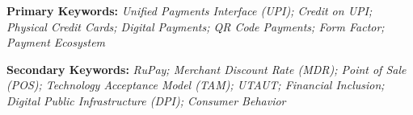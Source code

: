 \textbf{}

\textbf{Primary Keywords:}
\textit{Unified Payments Interface (UPI); Credit on UPI; Physical Credit Cards; Digital Payments; QR Code Payments; Form Factor; Payment Ecosystem}

\vspace{0.5cm}

\textbf{Secondary Keywords:}
\textit{RuPay; Merchant Discount Rate (MDR); Point of Sale (POS); Technology Acceptance Model (TAM); UTAUT; Financial Inclusion; Digital Public Infrastructure (DPI); Consumer Behavior}


